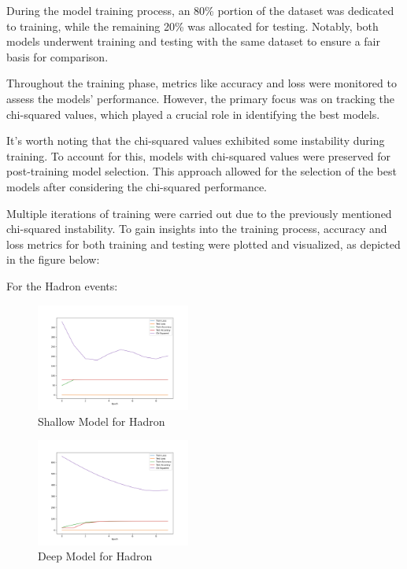 \documentclass[EPJ,twocolumn]{webofc}
\begin{document}
During the model training process, an 80\% portion of the dataset was dedicated to training, while the remaining 20\% was allocated for testing. Notably, both models underwent training and testing with the same dataset to ensure a fair basis for comparison.

Throughout the training phase, metrics like accuracy and loss were monitored to assess the models' performance. However, the primary focus was on tracking the chi-squared values, which played a crucial role in identifying the best models.

It's worth noting that the chi-squared values exhibited some instability during training. To account for this, models with chi-squared values were preserved for post-training model selection. This approach allowed for the selection of the best models after considering the chi-squared performance.

Multiple iterations of training were carried out due to the previously mentioned chi-squared instability. To gain insights into the training process, accuracy and loss metrics for both training and testing were plotted and visualized, as depicted in the figure below:

For the Hadron events: 
\begin{figure}[H]
\centering
    \includegraphics[width=0.45\textwidth]{graphs/nn_hadrons_metrics.png}
    \caption{Shallow Model for Hadron}
    \label{fig:accuracy_loss_hadr}
\end{figure}
\begin{figure}[H]
\centering
    \includegraphics[width=0.45\textwidth]{graphs/nn_hadrons_metrics_deeper.png}
    \caption{Deep Model for Hadron}
    \label{fig:accuracy_loss_hadr_deep}
\end{figure}
\end{document}
